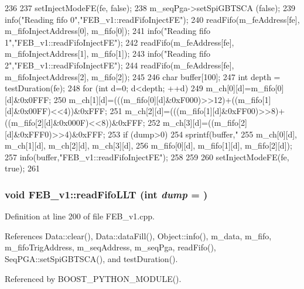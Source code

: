 \begin{DoxyCode}
236                                                 {
237   setInjectModeFE(fe, false);
238   m_seqPga->setSpiGBTSCA (false);
239   info("Reading fifo 0","FEB_v1::readFifoInjectFE");
240   readFifo(m_feAddress[fe], m_fifoInjectAddress[0], m_fifo[0]);
241   info("Reading fifo 1","FEB_v1::readFifoInjectFE");
242   readFifo(m_feAddress[fe], m_fifoInjectAddress[1], m_fifo[1]);
243   info("Reading fifo 2","FEB_v1::readFifoInjectFE");
244   readFifo(m_feAddress[fe], m_fifoInjectAddress[2], m_fifo[2]);
245   
246   char buffer[100];
247   int depth = testDuration(fe);
248   for (int d=0; d<depth; ++d){ 
249     m_ch[0][d]=m_fifo[0][d]&0x0FFF;
250     m_ch[1][d]=(((m_fifo[0][d]&0xF000)>>12)+((m_fifo[1][d]&0x00FF)<<4))&0xFFF;
251     m_ch[2][d]=(((m_fifo[1][d]&0xFF00)>>8)+((m_fifo[2][d]&0x000F)<<8))&0xFFF;
252     m_ch[3][d]=((m_fifo[2][d]&0xFFF0)>>4)&0xFFF;
253     if (dump>0) {
254       sprintf(buffer,"%
255           m_ch[0][d], m_ch[1][d], m_ch[2][d], m_ch[3][d],
256           m_fifo[0][d], m_fifo[1][d], m_fifo[2][d]);
257       info(buffer,"FEB_v1::readFifoInjectFE");
258     }
259   }
260   setInjectModeFE(fe, true);
261 }
\end{DoxyCode}
\hypertarget{classFEB__v1_a449a15db7087e4dbe6af0b0f96ec2038}{
\subsubsection[{readFifoLLT}]{\setlength{\rightskip}{0pt plus 5cm}void FEB\_\-v1::readFifoLLT (int {\em dump} = {})}}
\label{classFEB__v1_a449a15db7087e4dbe6af0b0f96ec2038}


Definition at line 200 of file FEB\_\-v1.cpp.

References Data::clear(), Data::dataFill(), Object::info(), m\_\-data, m\_\-fifo, m\_\-fifoTrigAddress, m\_\-seqAddress, m\_\-seqPga, readFifo(), SeqPGA::setSpiGBTSCA(), and testDuration().

Referenced by BOOST\_\-PYTHON\_\-MODULE().


